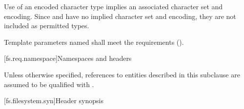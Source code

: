 \pnum
\begin{note}
Use of an encoded character type implies an associated
character set and encoding.
Since  and  have no
implied character set and encoding,
they are not included as permitted types.
\end{note}

\pnum
Template parameters named  shall meet the
 requirements ().

[fs.req.namespace]{Namespaces and headers}

\pnum
Unless otherwise specified, references to entities described in this
subclause are assumed to be qualified with .

[fs.filesystem.syn]{Header  synopsis}

